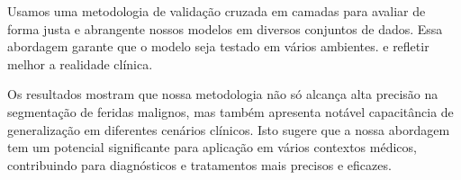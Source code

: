     Usamos uma metodologia de validação cruzada em camadas para avaliar de forma justa e abrangente nossos modelos em diversos conjuntos de dados. Essa abordagem garante que o modelo seja testado em vários ambientes. e refletir melhor a realidade clínica.

    Os resultados mostram que nossa metodologia não só alcança alta precisão na segmentação de feridas malignos, mas também apresenta notável capacitância de generalização em diferentes cenários clínicos. Isto sugere que a nossa abordagem tem um potencial significante para aplicação em vários contextos médicos, contribuindo para diagnósticos e tratamentos mais precisos e eficazes.
